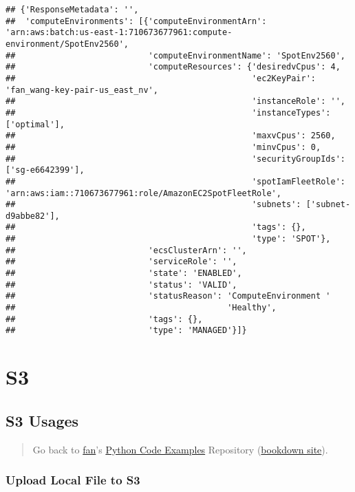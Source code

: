 \documentclass[
]{book}
\begin{document}
\begin{verbatim}
## {'ResponseMetadata': '',
##  'computeEnvironments': [{'computeEnvironmentArn': 'arn:aws:batch:us-east-1:710673677961:compute-environment/SpotEnv2560',
##                           'computeEnvironmentName': 'SpotEnv2560',
##                           'computeResources': {'desiredvCpus': 4,
##                                                'ec2KeyPair': 'fan_wang-key-pair-us_east_nv',
##                                                'instanceRole': '',
##                                                'instanceTypes': ['optimal'],
##                                                'maxvCpus': 2560,
##                                                'minvCpus': 0,
##                                                'securityGroupIds': ['sg-e6642399'],
##                                                'spotIamFleetRole': 'arn:aws:iam::710673677961:role/AmazonEC2SpotFleetRole',
##                                                'subnets': ['subnet-d9abbe82'],
##                                                'tags': {},
##                                                'type': 'SPOT'},
##                           'ecsClusterArn': '',
##                           'serviceRole': '',
##                           'state': 'ENABLED',
##                           'status': 'VALID',
##                           'statusReason': 'ComputeEnvironment '
##                                           'Healthy',
##                           'tags': {},
##                           'type': 'MANAGED'}]}
\end{verbatim}

\hypertarget{s3}{%
\section{S3}\label{s3}}

\hypertarget{s3-usages}{%
\subsection{S3 Usages}\label{s3-usages}}

\begin{quote}
Go back to \href{http://fanwangecon.github.io/}{fan}'s \href{https://fanwangecon.github.io/pyfan/}{Python Code Examples} Repository (\href{https://fanwangecon.github.io/pyfan/bookdown}{bookdown site}).
\end{quote}

\hypertarget{upload-local-file-to-s3}{%
\subsubsection{Upload Local File to S3}\label{upload-local-file-to-s3}}
\end{document}
